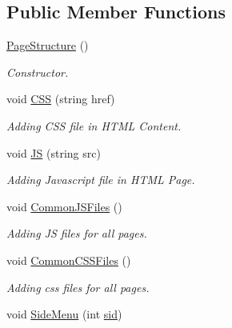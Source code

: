 \subsection*{Public Member Functions}
\begin{DoxyCompactItemize}
\item 
\hypertarget{classPageStructure_ae81b9e4e304ec2ec600b9a76bcb43271}{\hyperlink{classPageStructure_ae81b9e4e304ec2ec600b9a76bcb43271}{Page\-Structure} ()}\label{classPageStructure_ae81b9e4e304ec2ec600b9a76bcb43271}

\begin{DoxyCompactList}\small\item\em Constructor. \end{DoxyCompactList}\item 
void \hyperlink{classPageStructure_a109d21d10a5a95494ee078fc30fe13f2}{C\-S\-S} (string href)
\begin{DoxyCompactList}\small\item\em Adding C\-S\-S file in H\-T\-M\-L Content. \end{DoxyCompactList}\item 
void \hyperlink{classPageStructure_ae9f524db12d813e052d8b24834aa4c5b}{J\-S} (string src)
\begin{DoxyCompactList}\small\item\em Adding Javascript file in H\-T\-M\-L Page. \end{DoxyCompactList}\item 
\hypertarget{classPageStructure_a4ad1c0bdd9aa5b8d3d972bef7ba9c280}{void \hyperlink{classPageStructure_a4ad1c0bdd9aa5b8d3d972bef7ba9c280}{Common\-J\-S\-Files} ()}\label{classPageStructure_a4ad1c0bdd9aa5b8d3d972bef7ba9c280}

\begin{DoxyCompactList}\small\item\em Adding J\-S files for all pages. \end{DoxyCompactList}\item 
\hypertarget{classPageStructure_aea0a385d963928fea183c01d5cdfe5ab}{void \hyperlink{classPageStructure_aea0a385d963928fea183c01d5cdfe5ab}{Common\-C\-S\-S\-Files} ()}\label{classPageStructure_aea0a385d963928fea183c01d5cdfe5ab}

\begin{DoxyCompactList}\small\item\em Adding css files for all pages. \end{DoxyCompactList}\item 
\hypertarget{classPageStructure_a48684e8472242fe9b164074f89fa8c98}{void \hyperlink{classPageStructure_a48684e8472242fe9b164074f89fa8c98}{Side\-Menu} (int \hyperlink{classPageStructure_a70428385ed3cdc60d45bd432b984f6b9}{sid})}\label{classPageStructure_a48684e8472242fe9b164074f89fa8c98}


\end{DoxyCompactItemize}
